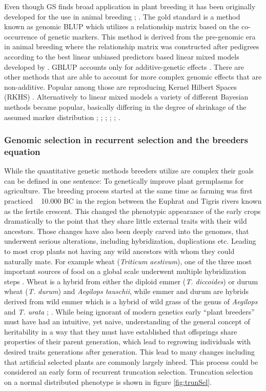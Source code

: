 Even though GS finds broad application in plant breeding it has been originally developed for the use in
animal breeding \cite{hayes2010genome}; \cite{goddard2011using}. The gold standard is a method known as
genomic BLUP \cite{vanraden2008efficient} which utilizes a relationship matrix based on the co-occurrence of
genetic markers. This method is derived from the pre-genomic era in animal breeding where the relationship
matrix was constructed after pedigrees according to the best linear unbiased predictors based linear mixed
models developed by \cite{henderson1975best}. GBLUP accounts only for additive-genetic effects
\cite{vanraden2008efficient}. There are other methods that are able to account for more complex genomic
effects that are non-additive. Popular among those are reproducing Kernel Hilbert Spaces (RKHS)
\cite{gianola2008reproducing}. Alternatively to linear mixed models a variety of different Bayesian methods
became popular, basically differing in the degree of shrinkage of the assumed marker distribution
\cite{hayes2001}; \cite{gianola2009}; \cite{habier2011}; \cite{gianola2013}; \cite{crossa2017};
\cite{azodi2019}.

\subsubsection{Genomic selection in recurrent selection and the breeders equation}

While the quantitative genetic methods breeders utilize are complex their goals can be defined in one
sentence: To genetically improve plant germplasms for agriculture. The breeding process started at the same
time as farming was first practiced ~ 10.000 BC in the region between the Euphrat and Tigris rivers known as
the fertile crescent. This changed the phenotypic appearance of the early crops dramatically to the point that
they share little external traits with their wild ancestors. Those changes have also been deeply carved into
the genomes, that underwent serious alterations, including hybridization, duplications etc. Leading to most
crop plants not having any wild ancestors with whom they could naturally mate. For example wheat
(\textit{Triticum aestivum}), one of the three most important sources of food on a global scale underwent
multiple hybridization steps \cite{ozkan2001allopolyploidy}. Wheat is a hybrid from either the diploid emmer
(\textit{T. diccoides}) or durum wheat (\textit{T. durum}) and \textit{{Aegilops tauschii}}, while emmer and
durum are hybrids derived from wild emmer which is a hybrid of wild grass of the genus of \textit{Aegilops}
and \textit{T. urata} \cite{friebe2000development}; \cite{feldman2012genome}. While being ignorant of modern
genetics early ``plant breeders'' must have had an intuitive, yet naive, understanding of the general concept
of heritability in a way that they must have established that offsprings share properties of their parent
generation, which lead to regrowing individuals with desired traits generations after generation. This lead to
many changes including that artificial selected plants are commonly largely inbred. This process could be
considered an early form of recurrent truncation selection. Truncation selection on a normal distributed
phenotype is shown in figure \ref{fig:trunSel}.
 
